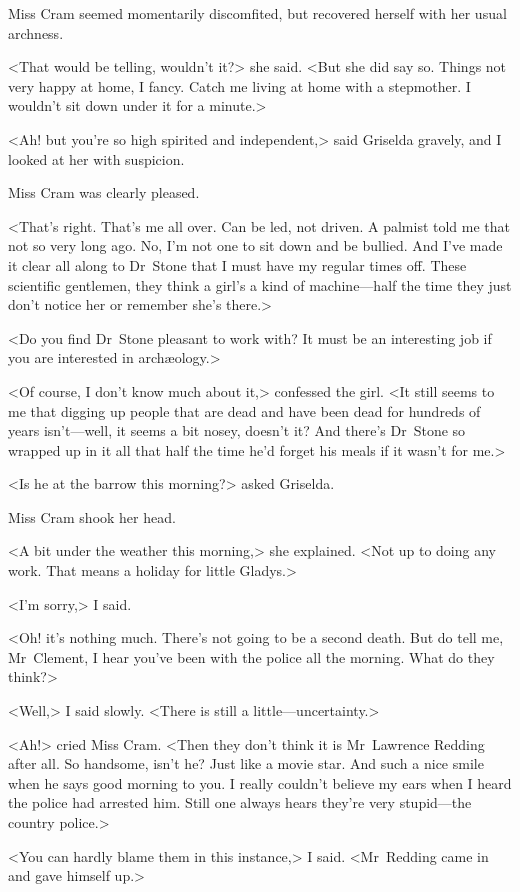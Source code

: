 Miss Cram seemed momentarily discomfited, but recovered herself with her usual archness.

<That would be telling, wouldn't it?> she said. <But she did say so. Things not very happy at home, I fancy. Catch me living at home with a stepmother. I wouldn't sit down under it for a minute.>

<Ah! but you're so high spirited and independent,> said Griselda gravely, and I looked at her with suspicion.

Miss Cram was clearly pleased.

<That's right. That's me all over. Can be led, not driven. A palmist told me that not so very long ago. No, I'm not one to sit down and be bullied. And I've made it clear all along to Dr~Stone that I must have my regular times off. These scientific gentlemen, they think a girl's a kind of machine—half the time they just don't notice her or remember she's there.>

<Do you find Dr~Stone pleasant to work with? It must be an interesting job if you are interested in archæology.>

<Of course, I don't know much about it,> confessed the girl. <It still seems to me that digging up people that are dead and have been dead for hundreds of years isn't—well, it seems a bit nosey, doesn't it? And there's Dr~Stone so wrapped up in it all that half the time he'd forget his meals if it wasn't for me.>

<Is he at the barrow this morning?> asked Griselda.

Miss Cram shook her head.

<A bit under the weather this morning,> she explained. <Not up to doing any work. That means a holiday for little Gladys.>

<I'm sorry,> I said.

<Oh! it's nothing much. There's not going to be a second death. But do tell me, Mr~Clement, I hear you've been with the police all the morning. What do they think?>

<Well,> I said slowly. <There is still a little—uncertainty.>

<Ah!> cried Miss Cram. <Then they don't think it is Mr~Lawrence Redding after all. So handsome, isn't he? Just like a movie star. And such a nice smile when he says good morning to you. I really couldn't believe my ears when I heard the police had arrested him. Still one always hears they're very stupid—the country police.>

<You can hardly blame them in this instance,> I said. <Mr~Redding came in and gave himself up.>

